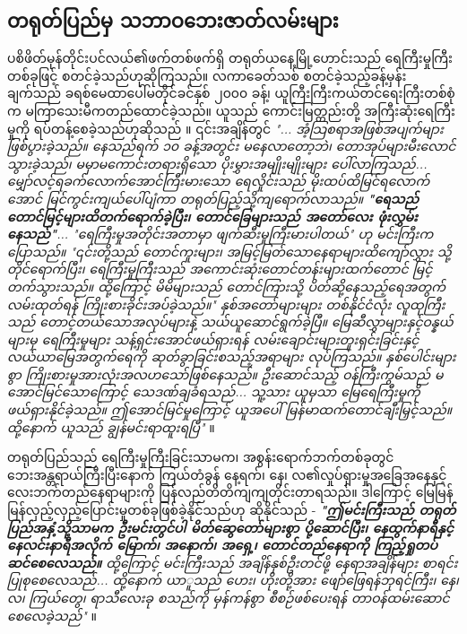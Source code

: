 \documentclass[10pt,twocolumn,letterpaper]{article}
\begin{document}
\subsection{တရုတ်ပြည်မှ သဘာဝဘေးဇာတ်လမ်းများ}

ပစိဖိတ်မုန်တိုင်းပင်လယ်၏ဖက်တစ်ဖက်ရှိ တရုတ်ယနေ့မြို့ဟောင်းသည် ရေကြီးမှုကြီးတစ်ခုဖြင့် စတင်ခဲ့သည်ဟုဆိုကြသည်။ လကာခေတ်သစ် စတင်ခဲ့သည့်ခန့်မှန်းချက်သည် ခရစ်မေထာပေါ်မတိုင်ခင်နှစ် ၂၀၀၀ ခန့်၊ ယူကြီးကြီးကယ်တင်ရေးကြီးတစ်စုံက မကြာသေးမီကတည်ထောင်ခဲ့သည်။ ယူသည် ကောင်းမြတ္တည်းတို့ အကြီးဆုံးရေကြီးမှုကို ရပ်တန့်စေခဲ့သည်ဟုဆိုသည် \cite{6}။ ၎င်းအချိန်တွင် \textit{"... အံ့သြစရာအဖြစ်အပျက်များဖြစ်ပွားခဲ့သည်။ နေသည်ရက် ၁၀ ခန့်အတွင်း မနေလာတော့ဘဲ၊ တောအုပ်များမီးလောင်သွားခဲ့သည်၊ မမှာမကောင်းတရားရှိသော ပိုးမွှားအမျိုးမျိုးများ ပေါ်လာကြသည်... မျှော်လင့်ရခက်လောက်အောင်ကြီးမားသော ရေလှိုင်းသည် မိုးထပ်ထိမြင်ရလောက်အောင် မြင်ကွင်းကျယ်ပေါ်ပျံကာ တရုတ်ပြည့်သို့ကျရောက်လာသည်။ \textbf{"ရေသည် တောင်မြင့်များထိတက်ရောက်ခဲ့ပြီး၊ တောင်ခြေများသည် အတော်လေး ဖုံးလွှမ်းနေသည်"}... "ရေကြီးမှုအတိုင်းအတာမှာ ဖျက်ဆီးမှုကြီးမားပါတယ်" ဟု မင်းကြီးက ပြောသည်။ "၎င်းတို့သည် တောင်ကူးများ၊ အမြင့်မြတ်သောနေရာများထိကျော်လွှား သို့တိုင်ရောက်ပြီး၊ ရေကြီးမှုကြီးသည် အကောင်းဆုံးတောင်တန်းများထက်တောင် မြင့်တက်သွားသည်။ ထို့ကြောင့် မိမိများသည် တောင်ကြားသို့ ပိတ်ဆို့နေသည့်ရေအတွက်လမ်းထုတ်ရန် ကြိုးစားခိုင်းအပ်ခဲ့သည်။" နှစ်အတော်များများ တစ်နိုင်ငံလုံး လူထုကြီးသည် တောင့်တယ်သောအလုပ်များနဲ့ သယ်ယူဆောင်ရွက်ခဲ့ပြီ။ မြေဆီလွှာများနှင့်ဝန္နယ်များမှ ရေကြီးမှုများ သန့်ရှင်းအောင်ဖယ်ရှားရန် လမ်းချောင်းများတူးရှင်းခြင်းနှင့် လယ်ယာမြေအတွက်ရေကို ဆုတ်ခွာခြင်းစသည့်အရာများ လုပ်ကြသည်။ နှစ်ပေါင်းများစွာ ကြိုးစားမှုအားလုံးအလဟသော်ဖြစ်နေသည်။ ဦးဆောင်သည့် ဝန်ကြီးကွမ်သည် မအောင်မြင်သောကြောင့် သေဒဏ်ချခံရသည်... သူ့သား ယူမှသာ မြေရေကြီးမှုကို ဖယ်ရှားနိုင်ခဲ့သည်။ ဤအောင်မြင်မှုကြောင့် ယူအပေါ် မြန်မာထက်တောင်ချီးမြှင့်သည်။ ထို့နောက် ယူသည် ချွန်မင်းရာထူးရပြီ"} \cite{5}။

တရုတ်ပြည်သည် ရေကြီးမှုကြီးခြင်းသာမက၊ အစွန်းရောက်ဘက်တစ်ခုတွင် ဘေးအန္တရာယ်ကြီးပြီးနောက် ကြယ်တံခွန် နေ့ရက်၊ နေ၊ လ၏လှုပ်ရှားမှုအခြေအနေနှင့် လေးဘက်တည်နေရာများကို ပြန်လည်တိတိကျကျတိုင်းတာရသည်။ ဒါကြောင့် မြေမြန်မြန်လှည့်လှည့်ပြောင်းမှုတစ်ခုဖြစ်ခဲ့နိုင်သည်ဟု ဆိုနိုင်သည် - \textit{\textbf{"ဤမင်းကြီးသည် တရုတ်ပြည်အနှံ့သို့သာမက ဦးမင်းတွင်ပါ မိတ်ဆွေတော်များစွာ ပို့ဆောင်ပြီး၊ နေထွက်နာရီနှင့် နေလင်းနာရီအလိုက် မြောက်၊ အနောက်၊ အရှေ့၊ တောင်တည်နေရာကို ကြည့်ရှုတပ်ဆင်စေလေသည်။} ထို့ကြောင့် မင်းကြီးသည် အချိန်နှစ်ဦးတင်ဖို့ နေရာအချိန်များ စာရင်းပြုစုစေလေသည်... ထို့နောက် ယာူသည် ဟေး၊ ဟိုးတို့အား ဖျော်ဖြေရန်ဘုရင်ကြီး၊ နေ၊ လ၊ ကြယ်တွေ၊ ရာသီလေးခု စသည်ကို မှန်ကန်စွာ စီစဉ်ဖစ်ပေးရန် တာဝန်ထမ်းဆောင်စေလေခဲ့သည်"} \cite{5}။
\end{document}
